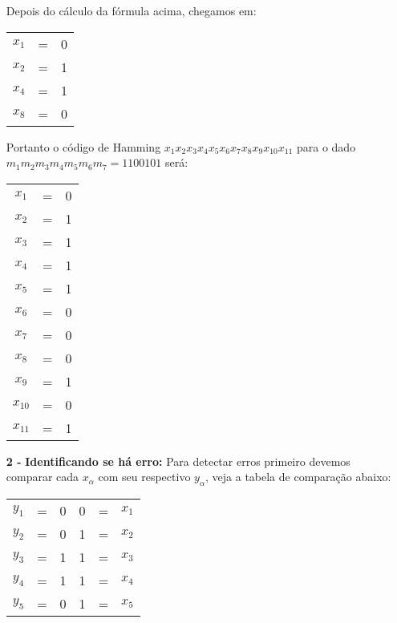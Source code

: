 \documentclass[12pt]{article}
\begin{document}
\begin{itemize}
			Depois do cálculo da fórmula acima, chegamos em:
			\begin{center}
				\begin{tabular}{ccl}
					$x_1$ & = & 0\\
					$x_2$ & = & 1\\
					$x_4$ & = & 1\\
					$x_8$ & = & 0\\
				\end{tabular}
			\end{center}
			Portanto o código de Hamming $x_1x_2x_3x_4x_5x_6x_7x_8x_9x_{10}x_{11}$ para 
			o dado $m_1m_2m_3m_4m_5m_6m_7 = 1100101$ será:
			\begin{center}
				\begin{tabular}{ccc}
					$x_1$ & = & 0\\
					$x_2$ & = & 1\\
					$x_3$ & = & 1 \\
					$x_4$ & = & 1\\
					$x_5$ & = & 1\\
					$x_6$ & = & 0\\
					$x_7$ & = & 0\\
					$x_8$ & = & 0\\
					$x_9$ & = & 1\\
					$x_{10}$ & = & 0\\
					$x_{11}$ & = & 1\\
				\end{tabular}
			\end{center}
		\newpage
		\item[\textbf{2 -}]
			\hfill\newline
			\subitem\textbf{Identificando se há erro:}
					\hfill\newline
					Para detectar erros primeiro devemos comparar cada $x_\alpha$ com seu respectivo $y_\alpha$,
					veja a tabela de comparação abaixo:
					\begin{center}
						\begin{tabular}{ccc|ccc}
							$y_1$ & = & 0 & 0 & = & $x_1$\\
							\color{red}$y_2$ & \color{red} = & \color{red}0 &
							\color{red}1 & \color{red} = & \color{red}$x_2$\\
							$y_3$ & = & 1 & 1 & = & $x_3$\\
							$y_4$ & = & 1 & 1 & = & $x_4$\\
							\color{red}$y_5$ & \color{red} = & \color{red} 0 &
							\color{red} 1 & \color{red} = & \color{red} $x_5$\\

\end{tabular}
\end{center}
\end{itemize}
\end{document}
